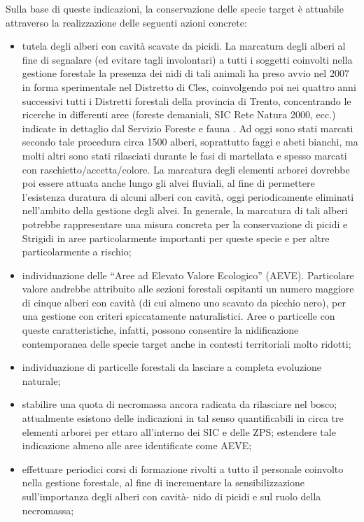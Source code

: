 \documentclass[10pt,twoside,openany,x11names,svgnames,italian,a5paper,dvipsnames,table]{memoir}
\begin{document}
Sulla base di queste indicazioni, la conservazione delle  specie target è attuabile attraverso la realizzazione delle seguenti azioni concrete:
\begin{itemize}\itemsep0pt
  \item tutela degli alberi con cavità scavate da picidi. La marcatura degli alberi al fine di segnalare (ed evitare tagli involontari) a tutti i soggetti coinvolti nella gestione forestale la presenza dei nidi di tali animali ha preso avvio nel 2007 in forma sperimentale nel Distretto di Cles, coinvolgendo poi nei quattro anni successivi tutti i Distretti forestali della provincia di Trento, concentrando le ricerche in differenti aree (foreste demaniali, SIC Rete Natura 2000, ecc.) indicate in dettaglio dal Servizio Foreste e fauna \cite{Marchesi08} \cite{Zorer09}. Ad oggi sono stati marcati secondo tale procedura circa 1500 alberi, soprattutto faggi e abeti bianchi, ma molti altri sono stati rilasciati durante le fasi di martellata e spesso marcati con raschietto/accetta/colore. La marcatura degli elementi arborei dovrebbe poi essere attuata anche lungo gli alvei fluviali, al fine di permettere l’esistenza duratura di alcuni alberi con cavità, oggi periodicamente eliminati nell’ambito della gestione degli alvei. In generale, la marcatura di tali alberi potrebbe rappresentare una misura concreta per la conservazione di picidi e Strigidi in aree particolarmente importanti per queste specie e per altre particolarmente a rischio;
  \item individuazione delle “Aree ad Elevato Valore Ecologico” (AEVE). Particolare valore andrebbe attribuito alle sezioni forestali ospitanti un numero maggiore di cinque alberi con cavità (di cui almeno uno scavato da picchio nero), per una gestione con criteri spiccatamente naturalistici. Aree o particelle con queste caratteristiche, infatti, possono consentire la nidificazione contemporanea delle specie target anche in contesti territoriali molto ridotti;
  \item individuazione di particelle forestali da lasciare a completa evoluzione naturale; 
  \item stabilire una quota di necromassa ancora radicata da rilasciare nel bosco; attualmente esistono delle indicazioni in tal senso quantificabili in circa tre elementi arborei per ettaro all’interno dei SIC e delle ZPS; estendere tale indicazione almeno alle aree identificate come AEVE;
  \item effettuare periodici corsi di formazione rivolti a tutto il personale coinvolto nella gestione forestale, al fine di incrementare la sensibilizzazione sull’importanza degli alberi con cavità- nido di picidi e sul ruolo della necromassa;

\end{itemize}
\end{document}
